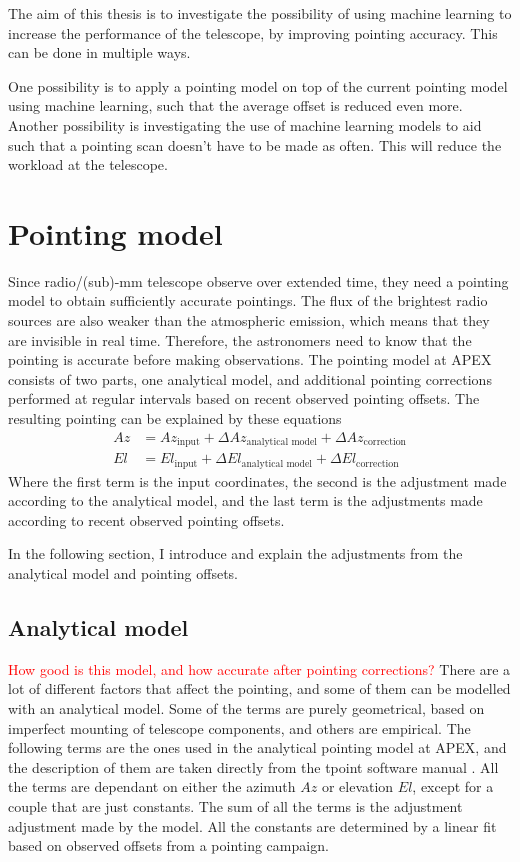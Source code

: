 The aim of this thesis is to investigate the possibility of using machine learning to increase the performance of the telescope, by improving pointing accuracy.
This can be done in multiple ways.

One possibility is to apply a pointing model on top of the current pointing model using machine learning, such that the average offset is reduced even more.
Another possibility is investigating the use of machine learning models to aid such that a pointing scan doesn't have to be made as often.
This will reduce the workload at the telescope. \\

\section{Pointing model}
Since radio/(sub)-mm telescope observe over extended time, they need a pointing model to obtain sufficiently accurate pointings.
The flux of the brightest radio sources are also weaker than the atmospheric emission, which means that they are invisible in real time.
Therefore, the astronomers need to know that the pointing is accurate before making observations.
The pointing model at APEX consists of two parts, one analytical model, and additional pointing corrections performed at regular intervals based on recent observed pointing offsets.
The resulting pointing can be explained by these equations
\begin{align}
    Az &= Az_\text{input} + \Delta Az_\text{analytical model} + \Delta Az_\text{correction} \\ 
    El &= El_\text{input} + \Delta El_\text{analytical model} + \Delta El_\text{correction}
\end{align}
Where the first term is the input coordinates, the second is the adjustment made according to the analytical model,
and the last term is the adjustments made according to recent observed pointing offsets.

In the following section, I introduce and explain the adjustments from the analytical model and pointing offsets. 


\subsection{Analytical model}
\textcolor{red}{How good is this model, and how accurate after pointing corrections?}
There are a lot of different factors that affect the pointing, 
and some of them can be modelled with an analytical model. Some of the terms are purely geometrical, based on imperfect mounting of telescope components,
and others are empirical. The following terms are the ones used in the analytical pointing model at APEX,
and the description of them are taken directly from the tpoint software manual \cite{tpoint_manual}.
All the terms are dependant on either the azimuth $Az$ or elevation $El$, except for a couple that are just constants. 
The sum of all the terms is the adjustment adjustment made by the model.
All the constants are determined by a linear fit based on observed offsets from a pointing campaign.


